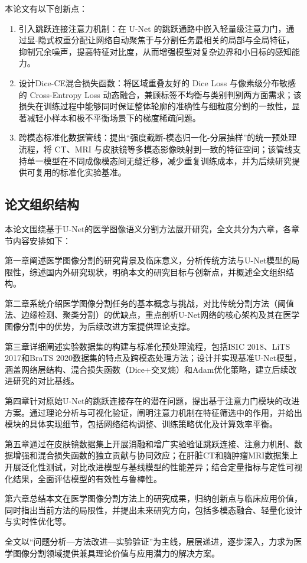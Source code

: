 本论文有以下创新点：

\begin{enumerate}
  \item 引入跳跃连接注意力机制：在 U-Net 的跳跃通路中嵌入轻量级注意力门，通过显-隐式权重分配让网络自动聚焦于与分割任务最相关的局部与全局特征，抑制冗余噪声，提高特征对比度，从而增强模型对复杂边界和小目标的感知能力。
  \item 设计Dice-CE混合损失函数：将区域重叠友好的 Dice Loss 与像素级分布敏感的 Cross-Entropy Loss 动态融合，兼顾标签不均衡与类别判别两方面需求；该损失在训练过程中能够同时保证整体轮廓的准确性与细粒度分割的一致性，显著减轻小样本和极不平衡场景下的梯度稀疏问题。
  \item 跨模态标准化数据管线：提出“强度截断-模态归一化-分层抽样”的统一预处理流程，将 CT、MRI 与皮肤镜等多模态影像映射到一致的特征空间；该管线支持单一模型在不同成像模态间无缝迁移，减少重复训练成本，并为后续研究提供可复用的标准化实验基准。
\end{enumerate}

\subsection{论文组织结构}

本论文围绕基于U-Net的医学图像语义分割方法展开研究，全文共分为六章，各章节内容安排如下：  

第一章阐述医学图像分割的研究背景及临床意义，分析传统方法与U-Net模型的局限性，综述国内外研究现状，明确本文的研究目标与创新点，并概述全文组织结构。  

第二章系统介绍医学图像分割任务的基本概念与挑战，对比传统分割方法（阈值法、边缘检测、聚类分割）的优缺点，重点剖析U-Net网络的核心架构及其在医学图像分割中的优势，为后续改进方案提供理论支撑。  

第三章详细阐述实验数据集的构建与标准化预处理流程，包括ISIC 2018、LiTS 2017和BraTS 2020数据集的特点及跨模态处理方法；设计并实现基准U-Net模型，涵盖网络层结构、混合损失函数（Dice+交叉熵）和Adam优化策略，建立后续改进研究的对比基线。  

第四章针对原始U-Net的跳跃连接存在的潜在问题，提出基于注意力门模块的改进方案。通过理论分析与可视化验证，阐明注意力机制在特征筛选中的作用，并给出模块的具体实现细节，包括网络结构调整、训练策略优化及计算效率平衡。  

第五章通过在皮肤镜数据集上开展消融和增广实验验证跳跃连接、注意力机制、数据增强和混合损失函数的独立贡献与协同效应；在肝脏CT和脑肿瘤MRI数据集上开展泛化性测试，对比改进模型与基线模型的性能差异；结合定量指标与定性可视化结果，全面评估模型的有效性与鲁棒性。  

第六章总结本文在医学图像分割方法上的研究成果，归纳创新点与临床应用价值，同时指出当前方法的局限性，并提出未来研究方向，包括多模态融合、轻量化设计与实时性优化等。  

全文以“问题分析—方法改进—实验验证”为主线，层层递进，逐步深入，力求为医学图像分割领域提供兼具理论价值与应用潜力的解决方案。